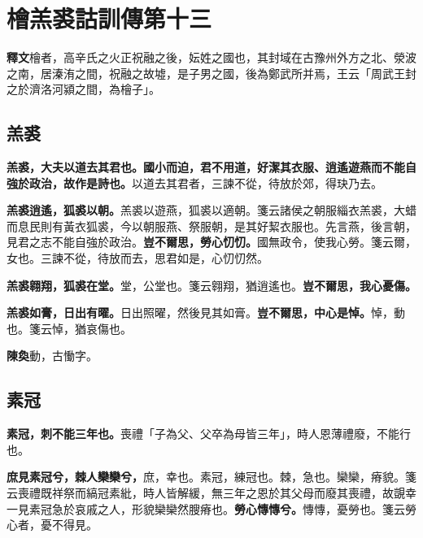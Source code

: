 \chapter{檜羔裘詁訓傳第十三}

\begin{quoting}\textbf{釋文}檜者，高辛氏之火正祝融之後，妘姓之國也，其封域在古豫州外方之北、滎波之南，居溱洧之間，祝融之故墟，是子男之國，後為鄭武所并焉，王云「周武王封之於濟洛河潁之間，為檜子」。\end{quoting}

\section{羔裘}


\textbf{羔裘，大夫以道去其君也。國小而迫，君不用道，好潔其衣服、逍遙遊燕而不能自強於政治，故作是詩也。}{\footnotesize 以道去其君者，三諫不從，待放於郊，得玦乃去。}

\textbf{羔裘逍遙，狐裘以朝。}{\footnotesize 羔裘以遊燕，狐裘以適朝。箋云諸侯之朝服緇衣羔裘，大蜡而息民則有黃衣狐裘，今以朝服燕、祭服朝，是其好絜衣服也。先言燕，後言朝，見君之志不能自強於政治。}\textbf{豈不爾思，勞心忉忉。}{\footnotesize 國無政令，使我心勞。箋云爾，女也。三諫不從，待放而去，思君如是，心忉忉然。}

\textbf{羔裘翱翔，狐裘在堂。}{\footnotesize 堂，公堂也。箋云翱翔，猶逍遙也。}\textbf{豈不爾思，我心憂傷。}

\textbf{羔裘如膏，日出有曜。}{\footnotesize 日出照曜，然後見其如膏。}\textbf{豈不爾思，中心是悼。}{\footnotesize 悼，動也。箋云悼，猶哀傷也。}

\begin{quoting}\textbf{陳奐}動，古慟字。\end{quoting}

\section{素冠}


\textbf{素冠，刺不能三年也。}{\footnotesize 喪禮「子為父、父卒為母皆三年」，時人恩薄禮廢，不能行也。}

\textbf{庶見素冠兮，棘人欒欒兮，}{\footnotesize 庶，幸也。素冠，練冠也。棘，急也。欒欒，瘠貌。箋云喪禮既祥祭而縞冠素紕，時人皆解緩，無三年之恩於其父母而廢其喪禮，故覬幸一見素冠急於哀戚之人，形貌欒欒然膄瘠也。}\textbf{勞心慱慱兮。}{\footnotesize 慱慱，憂勞也。箋云勞心者，憂不得見。}

